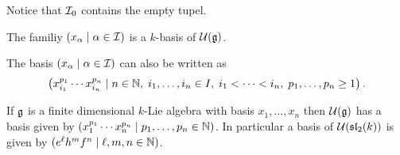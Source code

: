 \begin{rem}
 Notice that $\mathcal{I}_0$ contains the empty tupel.
\end{rem}


\begin{thrm} \label{thrm: pbw concrete}
 The familiy $(x_\alpha \mid \alpha \in \mathcal{I})$ is a $k$-basis of $\mathcal{U}(\mathfrak{g})$.
\end{thrm}


\begin{rem}
 The basis $(x_\alpha \mid \alpha \in \mathcal{I})$ can also be written as
 \[
  \left(
   x_{i_1}^{p_1} \dotsm x_{i_n}^{p_n}
  \mid
   n \in \mathbb{N},\;
   i_1, \dotsc, i_n \in I,\;
   i_1 < \dotsb < i_n,\;
   p_1, \dotsc, p_n \geq 1
  \right).
 \]
\end{rem}


\begin{expl}
 If $\mathfrak{g}$ is a finite dimensional $k$-Lie algebra with basis $x_1, \dotsc, x_n$ then $\mathcal{U}(\mathfrak{g})$ has a basis given by $(x_1^{p_1} \dotsm x_n^{p_n} \mid p_1, \dotsc, p_n \in \mathbb{N})$. In particular a basis of $\mathcal{U}(\mathfrak{sl}_2(k))$ is given by $(e^\ell h^m f^n \mid \ell, m ,n \in \mathbb{N})$.
\end{expl}



